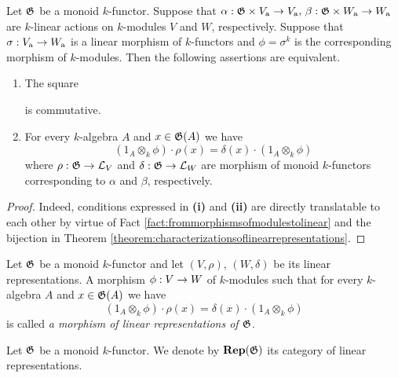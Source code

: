 \begin{proposition}\label{proposition:characterization_of_morphism_of_linear_representations}
Let ${\mathfrak G}$ be a monoid $k$-functor. Suppose that $\alpha:{\mathfrak G}\times V_{\mathrm{a}}\rightarrow V_{\mathrm{a}},\,\beta:{\mathfrak G}\times W_{\mathrm{a}}\rightarrow W_{\mathrm{a}}$ are $k$-linear actions on $k$-modules $V$ and $W$, respectively. Suppose that $\sigma:V_{\mathrm{a}}\rightarrow W_{\mathrm{a}}$ is a linear morphism of $k$-functors and $\phi = \sigma^k$ is the corresponding morphism of $k$-modules. Then the following assertions are equivalent.
\begin{enumerate}[label=\emph{\textbf{(\roman*)}}, leftmargin=1.5em]
\item The square
\begin{center}
\end{center}
is commutative.
\item For every $k$-algebra $A$ and $x\in {\mathfrak G}(A)$ we have
$$\left(1_A\otimes_k\phi\right)\cdot \rho(x) = \delta(x) \cdot \left(1_A\otimes_k\phi\right)$$
where $\rho:{\mathfrak G}\rightarrow {\mathcal L}_V$ and $\delta:{\mathfrak G}\rightarrow {\mathcal L}_W$ are morphism of monoid $k$-functors corresponding to $\alpha$ and $\beta$, respectively.
\end{enumerate}
\end{proposition}
\begin{proof}
Indeed, conditions expressed in \textbf{(i)} and \textbf{(ii)} are directly translatable to each other by virtue of Fact \ref{fact:frommorphismsofmodulestolinear} and the bijection in Theorem \ref{theorem:characterizationsoflinearrepresentations}. 
\end{proof}

\begin{definition}
Let ${\mathfrak G}$ be a monoid $k$-functor and let $(V,\rho)$, $(W,\delta)$ be its linear representations. A morphism $\phi:V\rightarrow W$ of $k$-modules such that for every $k$-algebra $A$ and $x\in {\mathfrak G}(A)$ we have
$$\left(1_A\otimes_k\phi\right)\cdot \rho(x) = \delta(x) \cdot \left(1_A\otimes_k\phi\right)$$
is called \textit{a morphism of linear representations of ${\mathfrak G}$}.
\end{definition}
\noindent
Let ${\mathfrak G}$ be a monoid $k$-functor. We denote by $\mathbf{Rep}({\mathfrak G})$ its category of linear representations.

